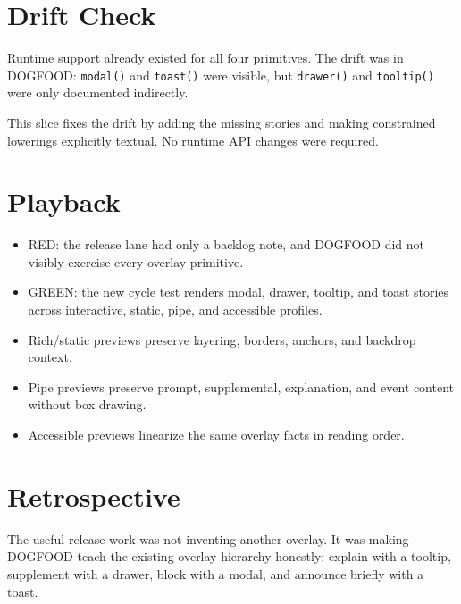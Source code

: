 \section{Drift Check}\label{record-102-drift-check}

Runtime support already existed for all four primitives. The drift was in DOGFOOD: \texttt{m\allowbreak{}o\allowbreak{}d\allowbreak{}a\allowbreak{}l\allowbreak{}(\allowbreak{})} and \texttt{t\allowbreak{}o\allowbreak{}a\allowbreak{}s\allowbreak{}t\allowbreak{}(\allowbreak{})} were visible, but \texttt{d\allowbreak{}r\allowbreak{}a\allowbreak{}w\allowbreak{}e\allowbreak{}r\allowbreak{}(\allowbreak{})} and \texttt{t\allowbreak{}o\allowbreak{}o\allowbreak{}l\allowbreak{}t\allowbreak{}i\allowbreak{}p\allowbreak{}(\allowbreak{})} were only documented indirectly.

This slice fixes the drift by adding the missing stories and making constrained lowerings explicitly textual. No runtime API changes were required.

\section{Playback}\label{record-102-playback}

\begin{itemize}
\tightlist
\item
  RED: the release lane had only a backlog note, and DOGFOOD did not visibly exercise every overlay primitive.
\item
  GREEN: the new cycle test renders modal, drawer, tooltip, and toast stories across interactive, static, pipe, and accessible profiles.
\item
  Rich/static previews preserve layering, borders, anchors, and backdrop context.
\item
  Pipe previews preserve prompt, supplemental, explanation, and event content without box drawing.
\item
  Accessible previews linearize the same overlay facts in reading order.
\end{itemize}

\section{Retrospective}\label{record-102-retrospective}

The useful release work was not inventing another overlay. It was making DOGFOOD teach the existing overlay hierarchy honestly: explain with a tooltip, supplement with a drawer, block with a modal, and announce briefly with a toast.

